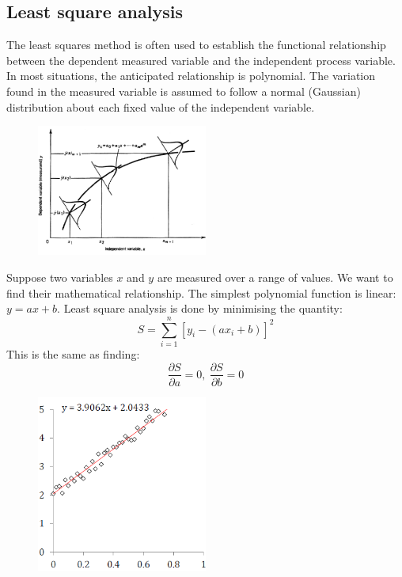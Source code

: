 \documentclass[class=report, crop=false, 12pt,a4paper]{standalone}
\begin{document}
\subsection{Least square analysis}
The least squares method is often used to establish the functional relationship between the dependent measured variable and the independent process variable. In most situations, the anticipated relationship is polynomial. The variation found in the measured variable is assumed to follow a normal (Gaussian) distribution about each fixed value of the independent variable.
\begin{figure}[H]
  \centering
  \includegraphics[width = 0.5\textwidth]{../img/diagram64.png}
\end{figure}
Suppose two variables $x$ and $y$ are measured over a range of values. We want to find their mathematical relationship. The simplest polynomial function is linear: $y = ax + b$. Least square analysis is done by minimising the quantity:
\begin{equation}
  S = \sum_{i = 1}^n [ y_i - (ax_i +b)]^2
\end{equation}
This is the same as finding:
\begin{equation}
  \frac{\partial S}{\partial a} = 0, \ \frac{\partial S}{\partial b} = 0
\end{equation}
\begin{figure}[H]
  \centering
  \includegraphics[width = 0.5\textwidth]{../img/diagram65.png}
\end{figure}
\end{document}
